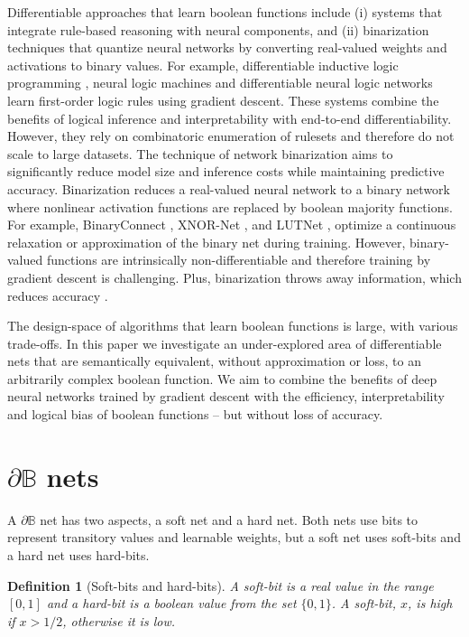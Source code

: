 \documentclass{article} %
\newtheorem*{definition}{Definition}
\begin{document}
Differentiable approaches that learn boolean functions include (i) systems that integrate rule-based reasoning with neural components, and (ii) binarization techniques that quantize neural networks by converting real-valued weights and activations to binary values. For example, differentiable inductive logic programming \citep{10.5555/3241691.3241692}, neural logic machines \citep{dong2018neural} 
and differentiable neural logic networks \cite{DBLP:phd/basesearch/Payani20} learn first-order logic rules using gradient descent. These systems combine the benefits of logical inference and interpretability with end-to-end differentiability. However, they rely on combinatoric enumeration of rulesets and therefore do not scale to large datasets. The technique of network binarization aims to significantly reduce model size and inference costs while maintaining predictive accuracy. Binarization reduces a real-valued neural network to a binary network where nonlinear activation functions are replaced by boolean majority functions. For example, BinaryConnect \citep{10.5555/2969442.2969588}, XNOR-Net \citep{10.1007/978-3-319-46493-0_32}, and LUTNet \citep{9026948}, optimize a continuous relaxation or approximation of the binary net during training. However, binary-valued functions are intrinsically non-differentiable and therefore training by gradient descent is challenging. Plus, binarization throws away information, which reduces accuracy \citep{QIN2020107281}. 

The design-space of algorithms that learn boolean functions is large, with various trade-offs. In this paper we investigate an under-explored area of differentiable nets that are semantically equivalent, without approximation or loss, to an arbitrarily complex boolean function. We aim to combine the benefits of deep neural networks trained by gradient descent with the efficiency, interpretability and logical bias of boolean functions -- but without loss of accuracy.

\section{$\partial\mathbb{B}$ nets}\label{sec:db-nets}

A $\partial \mathbb{B}$ net has two aspects, a soft net and a hard net. Both nets use bits to represent transitory values and learnable weights, but a soft net uses soft-bits and a hard net uses hard-bits.

\begin{definition}[Soft-bits and hard-bits]
A {\em soft-bit} is a real value in the range $[0,1]$ and a {\em hard-bit} is a boolean value from the set $\{0,1\}$. A soft-bit, $x$, is {\em high} if $x>1/2$, otherwise it is {\em low}.
\end{definition}
\end{document}
